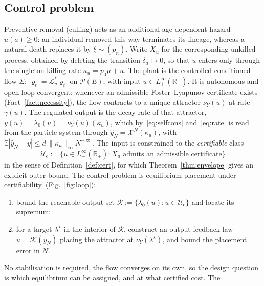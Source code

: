 \documentclass[letterpaper, 10pt, conference]{ieeeconf}
\newcommand{\E}{\mathbb{E}}
\newcommand{\R}{\mathbb{R}}
\newcommand{\calP}{\mathcal{P}}
\newcommand{\calU}{\mathcal{U}}
\newcommand{\calR}{\mathcal{R}}
\newcommand{\rev}[1]{#1}
\newcommand{\ed}[1]{#1}
\begin{document}
\subsection{\rev{Control problem}}\label{sec:problem}
Preventive removal (culling) acts as an additional age-dependent hazard
$u(a)\ge0$: an individual removed this way terminates its lineage, whereas a
natural death replaces it by $\xi\sim(p_n)$. Write $X_u$ for the corresponding
unkilled process, obtained by deleting the transition $\delta_a\mapsto0$, so
that $u$ enters only through the singleton killing rate $\kappa_u=p_0\mu+u$. The
plant is the controlled conditioned flow
$\Sigma:\ \dot\varrho_t=\mathcal L_u^{\ast}\varrho_t$ on $\calP(E)$, with input
$u\in L^\infty_+(\R_+)$. It is autonomous and \ed{open-loop convergent}: whenever an
admissible Foster--Lyapunov certificate exists (Fact~\ref{fact:necessity}), the
flow contracts to a unique attractor $\nu_Y(u)$ at rate $\gamma(u)$. The
regulated output is the decay rate of that attractor,
$y(u)=\lambda_0(u)=\nu_Y(u)(\kappa_u)$, which by~\eqref{eq:selfcons}
and~\eqref{eq:rate} is read from the particle system through
$\widehat y_N=\mathcal X^N(\kappa_u)$, with
$\E|\widehat y_N-y|\le d\,\|\kappa_u\|_\infty N^{-\varpi}$. The input is
constrained to the \rev{\emph{certifiable} class}
\[
\rev{\calU_{\mathrm c}}:=\{u\in L^\infty_+(\R_+):\text{$X_u$ admits an admissible certificate}\}
\]
\ed{in the sense of Definition~\ref{def:cert},}
\rev{for which Theorem~\ref{thm:envelope} gives an explicit outer bound.}
The control problem is equilibrium placement under certifiability~(Fig.~\ref{fig:loop}):
\begin{enumerate}[leftmargin=2.2em,itemsep=1pt]
\item[(i)] \ed{bound} the reachable output set
$\calR:=\{\lambda_0(u):u\in\calU\rev{_{\mathrm c}}\}$ \ed{and locate its
supremum};
\item[(ii)] for a target $\lambda^\star$ in the interior of $\calR$, construct
an output-feedback law $u=\mathcal K(\widehat y_N)$ placing the attractor at
$\nu_Y(\lambda^\star)$, and bound the placement error in $N$.
\end{enumerate}
No stabilisation is required, the flow converges on its own, so the design question is which equilibrium can be assigned, and at what certified cost. The
\end{document}
